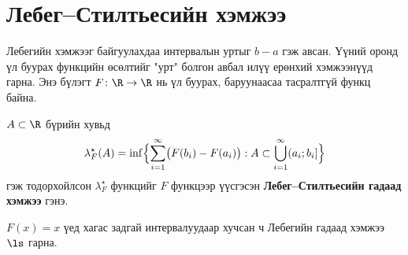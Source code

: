 \section{Лебег--Стилтьесийн хэмжээ}
Лебегийн хэмжээг байгуулахдаа интервалын уртыг $b-a$ гэж авсан. Үүний оронд үл буурах функцийн өсөлтийг "урт" болгон авбал илүү ерөнхий хэмжээнүүд гарна. Энэ бүлэгт $F\colon\R\to\R$ нь үл буурах, баруунаасаа тасралтгүй функц байна.

\begin{dfn}\label{lsouter}
$A\subset\R$ бүрийн хувьд
$$\lambda_F^{\star}(A)=\inf\Bigl\{\sum_{i=1}^{\infty}\bigl(F(b_i)-F(a_i)\bigr): A\subset\bigcup_{i=1}^{\infty}(a_i;b_i]\Bigr\}$$
гэж тодорхойлсон $\lambda_F^{\star}$ функцийг $F$ функцээр үүсгэсэн \textbf{Лебег--Стилтьесийн гадаад хэмжээ} гэнэ.
\end{dfn}
$F(x)=x$ үед хагас задгай интервалуудаар хучсан ч Лебегийн гадаад хэмжээ $\ls$ гарна.

